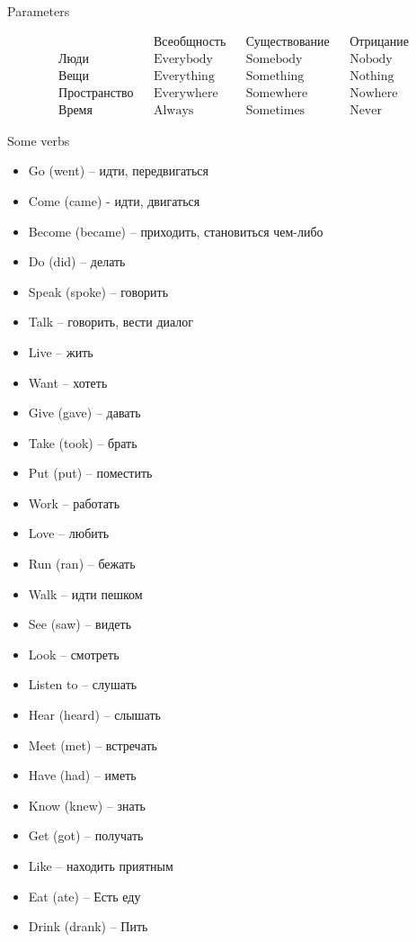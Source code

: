 \documentclass{tstextbook}
\begin{document}
\begin{theorem} Parameters
	\label{th: Parameters}
	
	\begin{align*}
		&& \text{Всеобщность} && \text{Существование} && \text{Отрицание} \\
		\text{Люди} && \text{Everybody} && \text{Somebody} && \text{Nobody} \\
		\text{Вещи} && \text{Everything} && \text{Something} && \text{Nothing} \\
		\text{Пространство} && \text{Everywhere} && \text{Somewhere} && \text{Nowhere} \\
		\text{Время} && \text{Always} && \text{Sometimes} && \text{Never}
	\end{align*}
\end{theorem}
	
	\begin{example}Some verbs
		\label{def:some_verbs}
		\begin{itemize}
			\item Go (went) -- идти, передвигаться
			\item Come (came) - идти, двигаться
			\item Become (became) -- приходить, становиться чем-либо
			\item Do (did) -- делать
			\item Speak (spoke) -- говорить
			\item Talk -- говорить, вести диалог	
			\item Live -- жить
			\item Want -- хотеть
			\item Give (gave) -- давать
			\item Take (took) -- брать
			\item Put (put) -- поместить
			\item Work -- работать
			\item Love -- любить
			\item Run (ran) -- бежать
			\item Walk -- идти пешком
			\item See (saw) -- видеть
			\item Look -- смотреть
			\item Listen to -- слушать
			\item Hear (heard) -- слышать
			\item Meet (met) -- встречать
			\item Have (had) -- иметь
			\item Know (knew) -- знать
			\item Get (got) -- получать
			\item Like -- находить приятным
			\item Eat (ate) -- Есть еду
			\item Drink (drank) -- Пить
		\end{itemize}
	\end{example}
\end{document}

